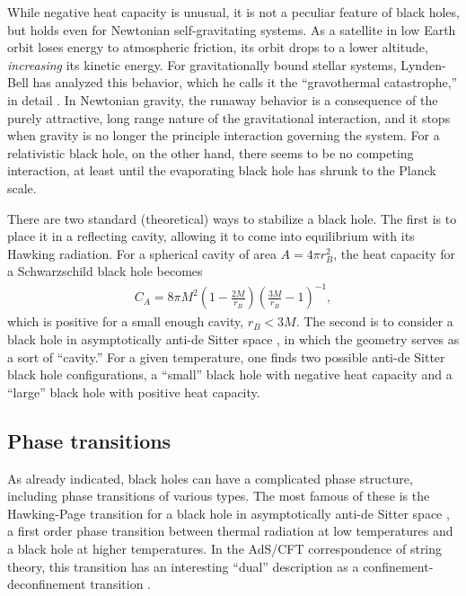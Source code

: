 \documentclass[11pt]{article}
\begin{document}
While negative heat capacity is unusual,
it is not a peculiar feature of black holes, but holds even
for Newtonian self-gravitating systems.  As a satellite in
low Earth orbit loses energy to atmospheric friction, its orbit drops
to a lower altitude, \emph{increasing} its kinetic energy.  For 
gravitationally bound stellar systems, Lynden-Bell has analyzed 
this behavior, which he calls it the ``gravothermal catastrophe,''
in detail \cite{LyndenBell}.  In Newtonian gravity, the runaway 
behavior is a consequence of the purely attractive, long range 
nature of the gravitational interaction, and it stops when gravity
is no longer the principle interaction governing the system.  For
a relativistic black hole, on the other hand, there seems to be no
competing interaction, at least until the evaporating black hole 
has shrunk to the Planck scale.

There are two standard (theoretical) ways to stabilize a black hole.
The first is to place it in a reflecting cavity, allowing it to come
into equilibrium with its Hawking radiation.  For a spherical cavity 
of area $A = 4\pi r_B^2$, the heat capacity for a Schwarzschild 
black hole becomes \cite{Yorkb}
\begin{align}
C_A = 8\pi M^2 \left(1-\frac{2M}{r_B}\right)%
          \left(\frac{3M}{r_B} -1\right)^{-1}  ,
\label{Carlipf3}
\end{align}
which is positive for a small enough cavity, $r_B<3M$.   The second
is to consider a black hole in asymptotically anti-de Sitter space
\cite{HawkingPage}, in which the geometry serves as a sort of 
``cavity.''  For a given temperature, one finds two possible anti-de 
Sitter black hole configurations, a ``small'' black hole with negative 
heat capacity and a ``large'' black hole with positive heat capacity.

\subsection{Phase transitions}

As already indicated, black holes can have a complicated phase
structure, including phase transitions of various types.  The most famous
of these is the Hawking-Page transition for a black hole in asymptotically 
anti-de Sitter space \cite{HawkingPage}, a first order phase transition 
between thermal radiation at low temperatures and a black hole at 
higher temperatures.  In the AdS/CFT correspondence of string theory, 
this transition has an interesting ``dual'' description as a confinement-%
deconfinement transition \cite{Witten_Page}.
\end{document}
